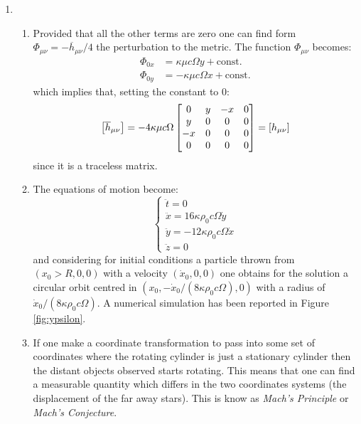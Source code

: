 \documentclass[11pt, oneside]{article}
\begin{document}
\begin{enumerate}
\item
\begin{enumerate}[label=(\alph*)]
	\item Provided that all the other terms are zero one can find form $\Phi_{\mu\nu} = -\overline{h}_{\mu\nu} /4$ the perturbation to the metric. The function $\Phi_{\mu\nu}$ becomes:
	\begin{align*}
		\Phi_{0x} &=  \kappa \mu c \Omega y + \text{const.} \\
		\Phi_{0y} &= -\kappa \mu c \Omega x + \text{const.}
	\end{align*}
	which implies that, setting the constant to 0:
	\[
		\qty[\overline{h}_{\mu\nu}] = - 4\kappa \mu c \Omega \begin{bmatrix}
			0 & y & -x & 0 \\
			y & 0 & 0 & 0 \\
			-x & 0 & 0 & 0 \\
			0 & 0 & 0 & 0 \\
		\end{bmatrix} = \qty[h_{\mu\nu}]
	\]
	since it is a traceless matrix.
	
	\item The equations of motion become:
	\[
		\begin{cases}
			\ddot{t} = 0 \\
			\ddot{x} = 16 \kappa \rho_0 c \Omega\dot{y} \\
			\ddot{y} = - 12 \kappa \rho_0 c \Omega \dot{x} \\
			\ddot{z} = 0
		\end{cases}
	\]
	and considering for initial conditions a particle thrown from $(x_0>R, 0, 0)$ with a velocity $(\dot{x}_0, 0,0)$ one obtains for the solution a circular orbit centred in $(x_0, -\dot{x}_0/(8\kappa \rho_0 c \Omega) ,0)$ with a radius of $\dot{x}_0/(8\kappa \rho_0 c \Omega)$.
	A numerical simulation has been reported in Figure \ref{fig:ypsilon}.
	
	\item If one make a coordinate transformation to pass into some set of coordinates where the rotating cylinder is just a stationary cylinder then the distant objects observed starts rotating. This means that one can find a measurable quantity which differs in the two coordinates systems (the displacement of the far away stars). This is know as \textit{Mach's Principle} or \textit{Mach's Conjecture}.

\end{enumerate}

\end{enumerate}
\end{document}
